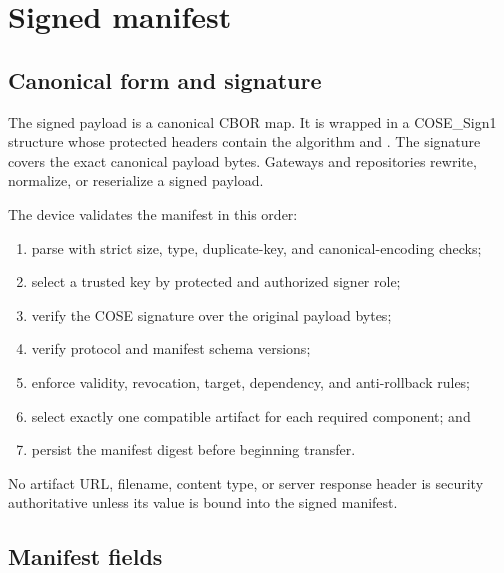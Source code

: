 \section{Signed manifest}

\subsection{Canonical form and signature}

The signed payload is a canonical CBOR map. It is wrapped in a COSE\_Sign1
structure whose protected headers contain the algorithm and . The
signature covers the exact canonical payload bytes. Gateways and repositories
\mustnot rewrite, normalize, or reserialize a signed payload.

The device validates the manifest in this order:

\begin{enumerate}
  \item parse with strict size, type, duplicate-key, and canonical-encoding checks;
  \item select a trusted key by protected  and authorized signer role;
  \item verify the COSE signature over the original payload bytes;
  \item verify protocol and manifest schema versions;
  \item enforce validity, revocation, target, dependency, and anti-rollback rules;
  \item select exactly one compatible artifact for each required component; and
  \item persist the manifest digest before beginning transfer.
\end{enumerate}

No artifact URL, filename, content type, or server response header is security
authoritative unless its value is bound into the signed manifest.

\subsection{Manifest fields}

